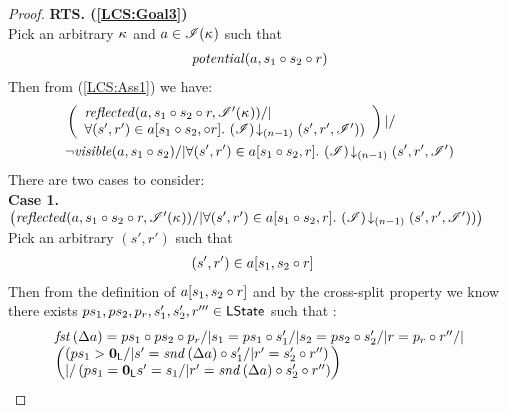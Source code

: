 \begin{lemma}
\begin{proof}
\noindent\textbf{RTS. (\ref{LCS:Goal3})}\\
Pick an arbitrary $\kappa_{}$ and $a \in \mathscr{I}(\kappa_{})$ such that 
\begin{align}
	\mathit{potential}(a, s_1 \circ s_2 \circ r) \label{LCS:Ass12}
\end{align}
Then from (\ref{LCS:Ass1}) we have: 
%
\begin{align*}
	& \left(
	\begin{array}{l}
		\m{reflected}(a,s_1 \composeL s_2 \composeL r,\lmod'(\ca{})) /|\\
		\for{(s', r') \in a[s_1 \composeL s_2, \composeL r]} \extendsAMUpto{\lmod}{(n-1)}{s'}{r'}{\lmod'})
	\end{array}	  
  \right)
  |/\null \nonumber \\
%  
  &\neg\m{visible}(a,s_1 \composeL s_2) /| \for{(s', r') \in a[s_1 \composeL s_2, r]}  \extendsAMUpto{\lmod}{(n-1)}{s'}{r'}{\lmod'}  \nonumber
\end{align*}
%
There are two cases to consider:\\
\noindent\textbf{Case 1. }\\
$
	\left(
	\begin{array}{@{} l @{}}
		\m{reflected}(a,s_1 \composeL s_2 \composeL r,\lmod'(\ca{})) /|
		\for{(s', r') \in a[s_1 \composeL s_2, r]} \extendsAMUpto{\lmod}{(n-1)}{s'}{r'}{\lmod'})
	\end{array}	  
  \right)
$\\
%
Pick an arbitrary $(s', r')$ such that 
\begin{align}
	&(s', r') \in a[s_1, s_2 \circ r] \label{LCS:Ass3}
\end{align}
%
Then from the definition of $a[s_1, s_2 \circ r]$ and by the cross-split property we know there exists $ps_1, ps_2, p_r, s_1', s_2', r''' \in \textsf{LState}$ such that :
%
\begin{align}
	\begin{array}{l}
		\fst{\updateFP{a}} = ps_1 \composeL ps_2 \composeL p_r /| s_1 = ps_1 \composeL s'_1 /| s_2 = ps_2 \composeL s'_2 /| r = p_r \composeL r'' /| \\
		\left(
		\begin{array}{@{} l @{}}
			\left(ps_1 > \unitL /| s' = \snd{\updateFP{a}} \composeL s'_1 /| r' = s'_2 \composeL r'' \right) \\
			|/ 
			\left(ps_1 = \unitL s' = s_1 /| r' = \snd{\updateFP{a}} \composeL s'_2 \composeL r''	\right)					
		\end{array}
		\right)
	\end{array}

\end{align}
\end{proof}
\end{lemma}
